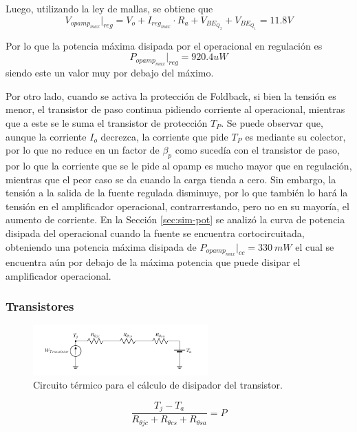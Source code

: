 Luego, utilizando la ley de mallas, se obtiene que
\begin{equation}
	V_{opamp_{max}}|_{reg} = V_o + I_{reg_{max}} \cdot R_a + V_{BE_{Q_2}} + V_{BE_{Q_1}} = 11.8V
\end{equation}

Por lo que la potencia máxima disipada por el operacional en regulación es
\begin{equation}
	P_{opamp_{max}}|_{reg} = 920.4uW
\end{equation}
siendo este un valor muy por debajo del máximo.

Por otro lado, cuando se activa la protección de Foldback, si bien la tensión es menor, el transistor de paso continua pidiendo corriente al operacional, mientras que a este se le suma el transistor de protección $T_P$. Se puede observar que, aunque la corriente $I_o$ decrezca, la corriente que pide $T_P$ es mediante su colector, por lo que no reduce en un factor de $\beta_p$ como sucedía con el transistor de paso, por lo que la corriente que se le pide al opamp es mucho mayor que en regulación, mientras que el peor caso se da cuando la carga tienda a cero. Sin embargo, la tensión a la salida de la fuente regulada disminuye, por lo que también lo hará la tensión en el amplificador operacional, contrarrestando, pero no en su mayoría, el aumento de corriente. En la Sección \ref{sec:sim-pot} se analizó la curva de potencia disipada del operacional cuando la fuente se encuentra cortocircuitada, obteniendo una potencia máxima disipada de $P_{opamp_{max}}|_{cc} = 330 \ mW$ el cual se encuentra aún por debajo de la máxima potencia que puede disipar el amplificador operacional.

\subsubsection{Transistores}
\begin{figure}[H]
\centering
	\includegraphics[width=0.6\textwidth, page=1]{ImagenesEjercicio2/Potencia.pdf}
	\caption{Circuito térmico para el cálculo de disipador del transistor.}
	\label{fig:circuitopottrans}
\end{figure}

\begin{equation}
\frac{T_j - T_a}{R_{\theta jc}+R_{\theta cs}+R_{\theta sa}} = P
\end{equation}

